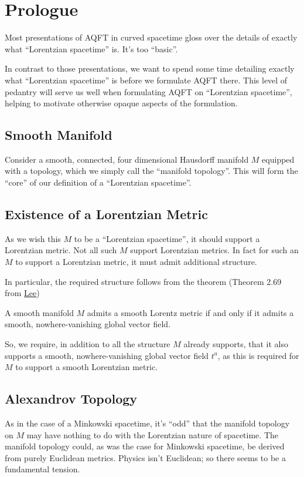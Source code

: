 \section{Prologue}\label{sctn:prologue}
Most presentations of AQFT in curved spacetime gloss over the details of exactly what ``Lorentzian spacetime'' is. It's too ``basic''.

In contrast to those presentations, we want to spend some time detailing exactly what ``Lorentzian spacetime'' is before we formulate AQFT there. This level of pedantry will serve us well when formulating AQFT on ``Lorentzian spacetime'', helping to motivate otherwise opaque aspects of the formulation.

\subsection{Smooth Manifold}
Consider a smooth, connected, four dimensional Hausdorff manifold $M$ equipped with a topology, which we simply call the ``manifold topology''. This will form the ``core'' of our definition of a ``Lorentzian spacetime''.

\subsection{Existence of a Lorentzian Metric}
As we wish this $M$ to be a ``Lorentzian spacetime'', it should support a Lorentzian metric. Not all such $M$ support Lorentzian metrics. In fact for such an $M$ to support a Lorentzian metric, it must admit additional structure.

In particular, the required structure follows from the theorem (Theorem 2.69 from \href{https://doi.org/10.1007/978-3-319-91755-9}{Lee})

\begin{theorem}
    A smooth manifold $M$ admits a smooth Lorentz metric if and only if it admits a smooth, nowhere-vanishing global vector field.
\end{theorem}

So, we require, in addition to all the structure $M$ already supports, that it also supports a smooth, nowhere-vanishing global vector field $t^a$, as this is required for $M$ to support a smooth Lorentzian metric.

\subsection{Alexandrov Topology}
As in the case of a Minkowski spacetime, it's ``odd'' that the manifold topology on $M$ may have nothing to do with the Lorentzian nature of spacetime. The manifold topology could, as was the case for Minkowski spacetime, be derived from purely Euclidean metrics. Physics isn't Euclidean; so there seems to be a fundamental tension.

